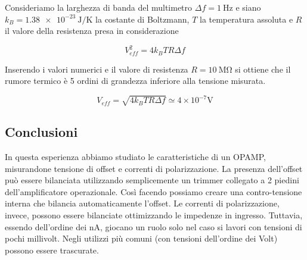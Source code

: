Consideriamo la larghezza di banda del multimetro $\Delta f = \SI{1}{\hertz}$ e siano $k_B = \SI{1.38e-23}{\joule\per\kelvin}$ la costante di Boltzmann, $T$ la temperatura assoluta e $R$ il valore della resistenza presa in considerazione

\begin{equation}
	V_{eff}^2 = 4 k_B T R \Delta f
\end{equation}

Inserendo i valori numerici e il valore di resistenza $R=\SI{10}{\mega\ohm}$ si ottiene che il rumore termico è 5 ordini di grandezza inferiore alla tensione misurata.

\begin{equation}
	V_{eff} = \sqrt{4 k_B T R \Delta f} \simeq 4 \times 10^{-7} \si{\volt}
\end{equation}






\subsection{Conclusioni}
In questa esperienza abbiamo studiato le caratteristiche di un OPAMP, misurandone tensione di offset e correnti di polarizzazione. La presenza dell'offset può essere bilanciata utilizzando semplicemente un trimmer collegato a 2 piedini dell'amplificatore operazionale. Così facendo possiamo creare una contro-tensione interna che bilancia automaticamente l'offset. Le correnti di polarizzazione, invece, possono essere bilanciate ottimizzando le impedenze in ingresso. Tuttavia, essendo dell'ordine dei \si{\nano\ampere}, giocano un ruolo solo nel caso si lavori con tensioni di pochi millivolt. Negli utilizzi più comuni (con tensioni dell'ordine dei Volt) possono essere trascurate.




